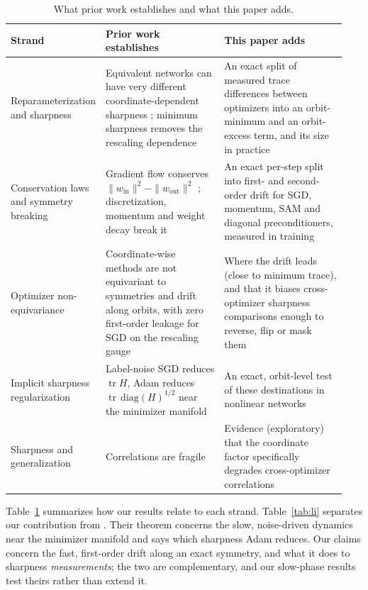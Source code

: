 \documentclass[10pt]{article}
\theoremstyle{remark}
\newcommand{\tr}{\operatorname{tr}}
\begin{document}
\begin{table}[t]
\centering
\small
\caption{What prior work establishes and what this paper adds.}
\label{tab:strands}
\begin{tabular}{@{}p{0.2\linewidth}p{0.36\linewidth}p{0.38\linewidth}@{}}
\toprule
Strand & Prior work establishes & This paper adds\\
\midrule
Reparameterization and sharpness & Equivalent networks can have very different coordinate-dependent sharpness \citep{dinh2017sharp,kristiadi2023geometry}; minimum sharpness removes the rescaling dependence \citep{ibayashi2021minimum} & An exact split of measured trace differences between optimizers into an orbit-minimum and an orbit-excess term, and its size in practice\\
Conservation laws and symmetry breaking & Gradient flow conserves $\|w_{\mathrm{in}}\|^2-\|w_{\mathrm{out}}\|^2$ \citep{arora2018optimization}; discretization, momentum and weight decay break it \citep{du2018algorithmic,kunin2021neural,medeiros2026conservation} & An exact per-step split into first- and second-order drift for SGD, momentum, SAM and diagonal preconditioners, measured in training\\
Optimizer non-equivariance & Coordinate-wise methods are not equivariant to symmetries and drift along orbits, with zero first-order leakage for SGD on the rescaling gauge \citep{ling2022vectoradam,singh2026loss,shirodkar2026dead,kim2026same} & Where the drift leads (close to minimum trace), and that it biases cross-optimizer sharpness comparisons enough to reverse, flip or mask them\\
Implicit sharpness regularization & Label-noise SGD reduces $\tr H$, Adam reduces $\tr\,\mathrm{diag}(H)^{1/2}$ near the minimizer manifold \citep{blanc2020implicit,damian2021label,li2025adam} & An exact, orbit-level test of these destinations in nonlinear networks\\
Sharpness and generalization & Correlations are fragile \citep{jiang2020fantastic,andriushchenko2023modern} & Evidence (exploratory) that the coordinate factor specifically degrades cross-optimizer correlations\\
\bottomrule
\end{tabular}
\end{table}

Table~\ref{tab:strands} summarizes how our results relate to each strand. Table~\ref{tab:li} separates our contribution from \citet{li2025adam}. Their theorem concerns the slow, noise-driven dynamics near the minimizer manifold and says which sharpness Adam reduces. Our claims concern the fast, first-order drift along an exact symmetry, and what it does to sharpness \emph{measurements}; the two are complementary, and our slow-phase results test theirs rather than extend it.
\end{document}

